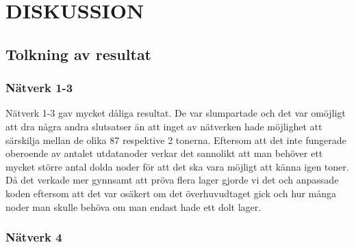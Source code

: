 \documentclass[a4paper,10pt]{article}
\begin{document}
\clearpage

\section{DISKUSSION}

\subsection{Tolkning av resultat}


\subsubsection{Nätverk 1-3}
Nätverk 1-3 gav mycket dåliga resultat. De var slumpartade och det var omöjligt att dra några andra slutsatser än att inget av nätverken hade möjlighet att särskilja mellan de olika 87 respektive 2 tonerna. Eftersom att det inte fungerade oberoende av antalet utdatanoder verkar det sannolikt att man behöver ett mycket större antal dolda noder för att det ska vara möjligt att känna igen toner. Då det verkade mer gynnsamt att pröva flera lager gjorde vi det och anpassade koden eftersom att det var osäkert om det överhuvudtaget gick och hur många noder man skulle behöva om man endast hade ett dolt lager.
\subsubsection{Nätverk 4}
\end{document}
